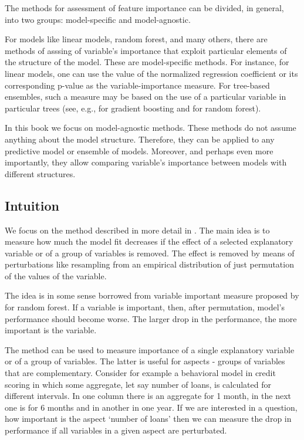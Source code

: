 \documentclass[12pt,]{krantz}
\begin{document}
The methods for assessment of feature importance can be divided, in general, into two groups: model-specific and model-agnostic.

For models like linear models, random forest, and many others, there are methods of asssing of variable's importance that exploit particular elements of the structure of the model. These are model-specific methods. For instance, for linear models, one can use the value of the normalized regression coefficient or its corresponding p-value as the variable-importance measure. For tree-based ensembles, such a measure may be based on the use of a particular variable in particular trees (see, e.g., \citep{xgboostExplainer} for gradient boosting and \citep{randomForestExplainer} for random forest).

In this book we focus on model-agnostic methods. These methods do not assume anything about the model structure. Therefore, they can be applied to any predictive model or ensemble of models. Moreover, and perhaps even more importantly, they allow comparing variable's importance between models with different structures.

\hypertarget{featureImportanceIntuition}{%
\subsection{Intuition}\label{featureImportanceIntuition}}

We focus on the method described in more detail in \citep{variableImportancePermutations}. The main idea is to measure how much the model fit decreases if the effect of a selected explanatory variable or of a group of variables is removed. The effect is removed by means of perturbations like resampling from an empirical distribution of just permutation of the values of the variable.

The idea is in some sense borrowed from variable important measure proposed by  for random forest. If a variable is important, then, after permutation, model's performance should become worse. The larger drop in the performance, the more important is the variable.

The method can be used to measure importance of a single explanatory variable or of a group of variables. The latter is useful for aspects - groups of variables that are complementary. Consider for example a behavioral model in credit scoring in which some aggregate, let say number of loans, is calculated for different intervals. In one column there is an aggregate for 1 month, in the next one is for 6 months and in another in one year. If we are interested in a question, how important is the aspect `number of loans' then we can measure the drop in performance if all variables in a given aspect are perturbated.
\end{document}
